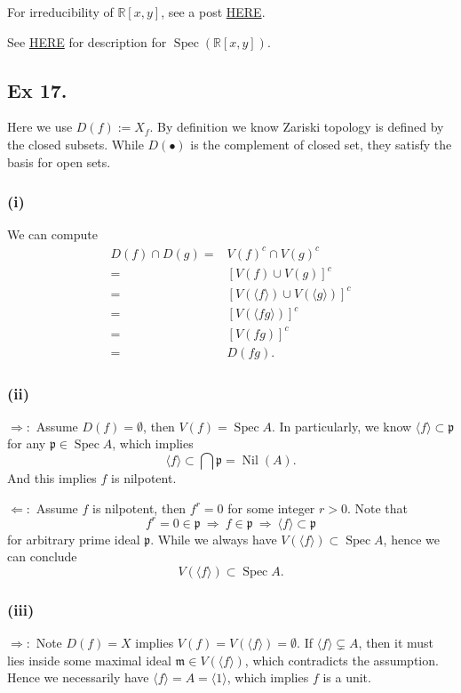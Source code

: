 For irreducibility of $\mathbb R[x,y]$, see a post \href{https://math.stackexchange.com/questions/125146/irreducibility-of-a-polynomial-in-the-ring-mathbbrx-y}{HERE}.

See \href{https://math.stackexchange.com/questions/1281142/what-are-the-closed-points-of-mathbba-mathbbr2-operatornamespec}{HERE} for description for $\operatorname{Spec}(\mathbb R[x,y])$. 



\subsection{Ex 17.}\label{Atiyah Chapter 1 Ex 17.}
Here we use $D(f):=X_{f}$.
By definition we know Zariski topology is defined by the closed subsets. While $D(\bullet)$ is the complement of closed set, they satisfy the basis for open sets. 
\subsubsection{(i)}
We can compute \begin{align*}
    D(f)\cap D(g) =& V(f)^c \cap V(g)^c\\
    =& [V(f)\cup V(g)]^c\\
    =& [V(\langle f\rangle)\cup V(\langle g\rangle)]^c\\
    =& [V(\langle fg\rangle)]^c\\
    =& [V(fg)]^c\\
    =& D(fg).
\end{align*}
\subsubsection{(ii)}
$\Rightarrow:$ Assume $D(f)=\emptyset$, then $V(f)=\operatorname{Spec}A$. In particularly, we know $\langle f\rangle\subset \mathfrak p$ for any $\mathfrak p\in \operatorname{Spec}A$, which implies 
$$\langle f\rangle \subset \bigcap \mathfrak p=\operatorname{Nil}(A).$$ And this implies $f$ is nilpotent.

$\Leftarrow:$ Assume $f$ is nilpotent, then $f^r=0$ for some integer $r>0$. Note that 
$$f^r=0\in\mathfrak p ~\Rightarrow~ f\in\mathfrak p ~\Rightarrow~ \langle f\rangle \subset \mathfrak p$$ for arbitrary prime ideal $\mathfrak p$. While we always have $V(\langle f\rangle)\subset\operatorname{Spec}A$, hence we can conclude $$V(\langle f\rangle)\subset\operatorname{Spec}A.$$
\subsubsection{(iii)}
$\Rightarrow:$ Note $D(f)=X$ implies $V(f)=V(\langle f\rangle)=\emptyset$. If $\langle f\rangle\subsetneq A$, then it must lies inside some maximal ideal $\mathfrak m\in V(\langle f\rangle)$, which contradicts the assumption. Hence we necessarily have $\langle f\rangle =A=\langle 1\rangle$, which implies $f$ is a unit. 

